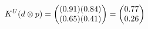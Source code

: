 \documentclass[preview]{standalone}
\begin{document}
\begin{align*}
\special{dvisvgm:raw <g id='unique000'>}K^U(d \otimes p) = \begin{pmatrix} (0.91)(0.84) \\ (0.65)(0.41) \end{pmatrix} = \begin{pmatrix} 0.77 \\ 0.26 \end{pmatrix}\special{dvisvgm:raw </g>}
\end{align*}
\end{document}
